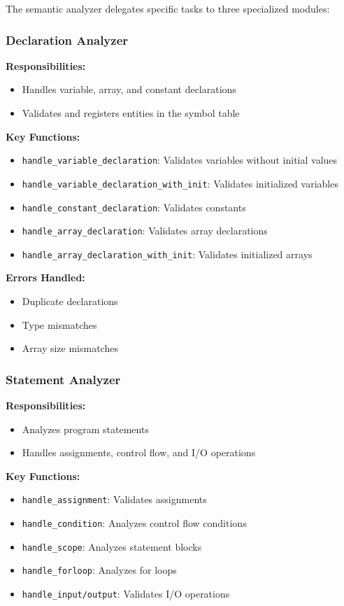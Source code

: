 \documentclass[12pt,a4paper]{article}
\begin{document}
The semantic analyzer delegates specific tasks to three specialized modules:

\subsubsection{Declaration Analyzer}

\textbf{Responsibilities:}
\begin{itemize}
	\item Handles variable, array, and constant declarations
	\item Validates and registers entities in the symbol table
\end{itemize}

\textbf{Key Functions:}
\begin{itemize}
	\item \texttt{handle\_variable\_declaration}: Validates variables without initial values
	\item \texttt{handle\_variable\_declaration\_with\_init}: Validates initialized variables
	\item \texttt{handle\_constant\_declaration}: Validates constants
	\item \texttt{handle\_array\_declaration}: Validates array declarations
	\item \texttt{handle\_array\_declaration\_with\_init}: Validates initialized arrays
\end{itemize}

\textbf{Errors Handled:}
\begin{itemize}
	\item Duplicate declarations
	\item Type mismatches
	\item Array size mismatches
\end{itemize}

\subsubsection{Statement Analyzer}

\textbf{Responsibilities:}
\begin{itemize}
	\item Analyzes program statements
	\item Handles assignments, control flow, and I/O operations
\end{itemize}

\textbf{Key Functions:}
\begin{itemize}
	\item \texttt{handle\_assignment}: Validates assignments
	\item \texttt{handle\_condition}: Analyzes control flow conditions
	\item \texttt{handle\_scope}: Analyzes statement blocks
	\item \texttt{handle\_forloop}: Analyzes for loops
	\item \texttt{handle\_input/output}: Validates I/O operations
\end{itemize}
\end{document}
